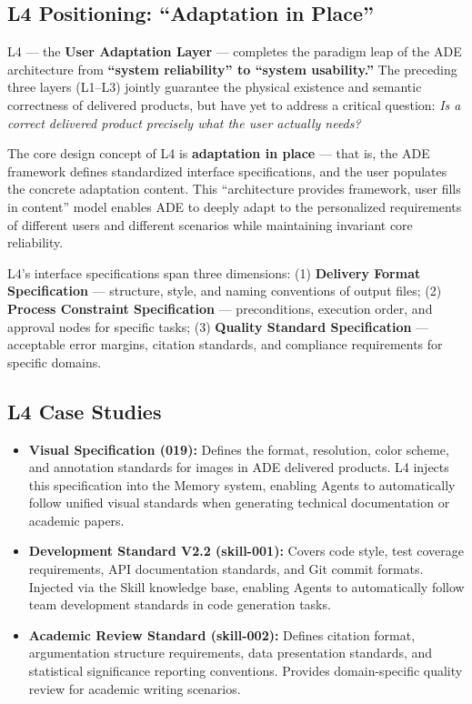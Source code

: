 \documentclass[11pt,a4paper]{article}
\begin{document}
\subsection{L4 Positioning: ``Adaptation in Place''}

L4 --- the \textbf{User Adaptation Layer} --- completes the paradigm leap of the ADE architecture from \textbf{``system reliability'' to ``system usability.''} The preceding three layers (L1--L3) jointly guarantee the physical existence and semantic correctness of delivered products, but have yet to address a critical question: \emph{Is a correct delivered product precisely what the user actually needs?}

The core design concept of L4 is \textbf{adaptation in place} --- that is, the ADE framework defines standardized interface specifications, and the user populates the concrete adaptation content. This ``architecture provides framework, user fills in content'' model enables ADE to deeply adapt to the personalized requirements of different users and different scenarios while maintaining invariant core reliability.

L4's interface specifications span three dimensions: (1) \textbf{Delivery Format Specification} --- structure, style, and naming conventions of output files; (2) \textbf{Process Constraint Specification} --- preconditions, execution order, and approval nodes for specific tasks; (3) \textbf{Quality Standard Specification} --- acceptable error margins, citation standards, and compliance requirements for specific domains.

\subsection{L4 Case Studies}

\begin{itemize}
  \item \textbf{Visual Specification (019):} Defines the format, resolution, color scheme, and annotation standards for images in ADE delivered products. L4 injects this specification into the Memory system, enabling Agents to automatically follow unified visual standards when generating technical documentation or academic papers.

  \item \textbf{Development Standard V2.2 (skill-001):} Covers code style, test coverage requirements, API documentation standards, and Git commit formats. Injected via the Skill knowledge base, enabling Agents to automatically follow team development standards in code generation tasks.

  \item \textbf{Academic Review Standard (skill-002):} Defines citation format, argumentation structure requirements, data presentation standards, and statistical significance reporting conventions. Provides domain-specific quality review for academic writing scenarios.
\end{itemize}
\end{document}
